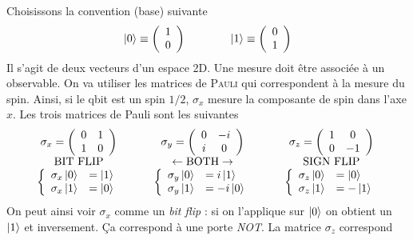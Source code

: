Choisissons la convention (base) suivante
\begin{equation}
\ket0\equiv\left(\begin{array}{c}
1\\
0
\end{array}\right)\qquad\qquad\ket1\equiv\left(\begin{array}{c}
0\\
1
\end{array}\right)
\end{equation}
Il s'agit de deux vecteurs d'un espace 2D. Une mesure doit être associée à un observable. On 
va utiliser les matrices de \textsc{Pauli} qui correspondent à la mesure du spin. Ainsi, si 
le qbit est un spin $1/2$, $\sigma_x$ mesure la composante de spin dans l'axe $x$. Les trois
matrices de Pauli sont les suivantes
\begin{equation}
\begin{array}{ccc}
\sigma_x = \left(\begin{array}{cc}
0&1\\
1&0
\end{array}\right) &\qquad \sigma_y = \left(\begin{array}{cc}
0&-i\\
i&0
\end{array}\right) &\qquad \sigma_z = \left(\begin{array}{cc}
1&0\\
0&-1
\end{array}\right)\\
\text{BIT FLIP} &\qquad \leftarrow \text{BOTH}\rightarrow &\qquad \text{SIGN FLIP}\\
\left\{\begin{array}{ll}
\sigma_x\ket0 &= \ket 1\\
\sigma_x\ket1 &= \ket 0
\end{array}\right. &\qquad\left\{\begin{array}{ll}
\sigma_y\ket0 &= i\ket 1\\
\sigma_y\ket1 &= -i\ket 0
\end{array}\right.&\qquad\left\{\begin{array}{ll}
\sigma_z\ket0 &= \ket 0\\
\sigma_z\ket1 &= -\ket 1
\end{array}\right.
\end{array}
\end{equation}
On peut ainsi voir $\sigma_x$ comme un \textit{bit flip} : si on l'applique sur $\ket0$ on obtient
un $\ket 1$ et inversement. Ça correspond à une porte \textit{NOT}. La matrice $\sigma_z$ correspond
